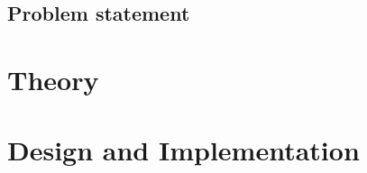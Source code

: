 \section{Problem statement}



\chapter{Theory}






\chapter{Design and Implementation}












\appendix






